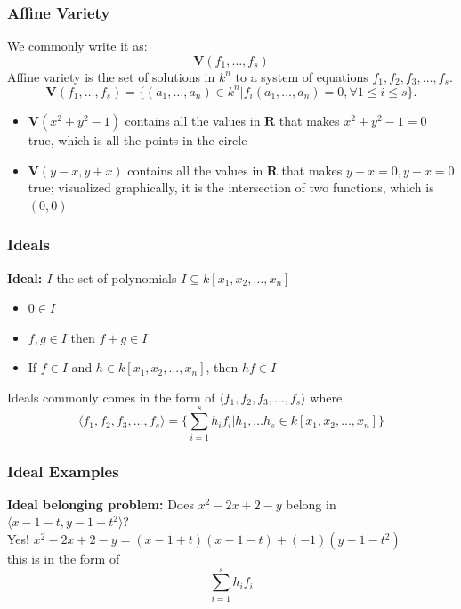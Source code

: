 \documentclass{beamer}
\begin{document}
\begin{frame}
\frametitle{Affine Variety}
We commonly write it as: 
$$\mathbf{V}(f_1, \dots, f_s)$$
Affine variety is the set of solutions in $k^n$ to a system of equations $f_1, f_2, f_3,\dots, f_s$.  
$$\mathbf{V}(f_1, \dots, f_s) = \{(a_1,\dots,a_n) \in k^n | f_i(a_1, \dots, a_n) = 0 , \forall 1 \le i \le s\}.$$

\begin{Examples}
\begin{itemize}
    \item<1-> $\mathbf{V}(x^2 + y^2 -1)$ contains all the values in $\mathbf{R}$ that makes $x^2 + y^2 -1 = 0$ true, which is all the points in the circle
    \item<1-> \textbf{$\mathbf{V}(y-x, y + x)$} contains all the values in $\mathbf{R}$ that makes $y-x = 0, y + x = 0$ true; visualized graphically, it is the intersection of two functions, which is $(0, 0)$
\end{itemize}
\end{Examples}

\end{frame}

\begin{frame}
\frametitle{Ideals}
\textbf{Ideal: $I$} the set of polynomials 
\newline
$I \subseteq{k[x_1, x_2,..., x_n]}$ 
    \begin{itemize}
        \item<1-> $0 \in I$
        \item<1-> $f, g \in I$ then $f+g \in I$
        \item<1-> If $f \in I$ and $h\in k[x_1, x_2,..., x_n]$, then $hf \in I$
    \end{itemize}
    Ideals commonly comes in the form of $\langle f_1, f_2, f_3, \dots, f_s \rangle$ where $$\langle f_1, f_2, f_3, \dots, f_s \rangle = \{\sum_{i=1}^sh_if_i|h_1,\dots h_s \in k[x_1, x_2,..., x_n]\} $$
\end{frame}

\begin{frame}
\frametitle{Ideal Examples}
\textbf{Ideal belonging problem:}
    Does $x^2-2x+2-y$ belong in $\langle x-1-t, y-1-t^2\rangle$? \pause
\newline 
\\
    Yes! $x^2-2x+2-y = (x-1+t)(x-1-t) + (-1)(y-1-t^2)$
\\ this is in the form of $$\sum_{i=1}^sh_if_i$$

\end{frame}
\end{document}
